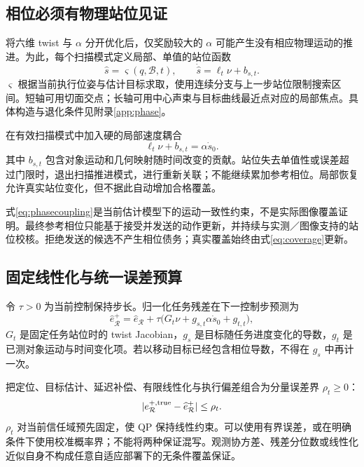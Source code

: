 \documentclass[UTF8,11pt,a4paper,fontset=fandol]{ctexart}
\numberwithin{equation}{section}
\theoremstyle{definition}
\begin{document}
\subsection{相位必须有物理站位见证}
\label{sec:phase}
将六维 twist 与 $\alpha$ 分开优化后，仅奖励较大的 $\alpha$ 可能产生没有相应物理运动的推进。为此，每个扫描模式定义局部、单值的站位函数
\begin{equation}
\widehat s=\varsigma(q,\mathcal B,t),\qquad
\dot{\widehat s}=\ell_t\nu+b_{s,t}.
\label{eq:station}
\end{equation}
$\varsigma$ 根据当前执行位姿与估计目标求取，使用连续分支与上一步站位限制搜索区间。短轴可用切面交点；长轴可用中心声束与目标曲线最近点对应的局部焦点。具体构造与退化条件见附录\ref{app:phase}。

在有效扫描模式中加入硬的局部速度耦合
\begin{equation}
\boxed{\ell_t\nu+b_{s,t}=\alpha\dot s_0.}
\label{eq:phasecoupling}
\end{equation}
其中 $b_{s,t}$ 包含对象运动和几何映射随时间改变的贡献。站位失去单值性或误差超过门限时，退出扫描推进模式，进行重新关联；不能继续累加参考相位。局部恢复允许真实站位变化，但不据此自动增加合格覆盖。

式\eqref{eq:phasecoupling}是当前估计模型下的运动一致性约束，不是实际图像覆盖证明。最终参考相位只能基于接受并发送的动作更新，并持续与实测／图像支持的站位校核。拒绝发送的候选不产生相位债务；真实覆盖始终由式\eqref{eq:coverage}更新。

\subsection{固定线性化与统一误差预算}
令 $\tau>0$ 为当前控制保持步长。归一化任务残差在下一控制步预测为
\begin{equation}
\widehat e_{\mathcal R}^+
=\widehat e_{\mathcal R}+\tau\bigl(G_t\nu+g_{s,t}\alpha\dot s_0+g_{t,t}\bigr),
\label{eq:onepred}
\end{equation}
$G_t$ 是固定任务站位时的 twist Jacobian，$g_s$ 是目标随任务进度变化的导数，$g_t$ 是已测对象运动与时间变化项。若以移动目标已经包含相位导数，不得在 $g_s$ 中再计一次。

把定位、目标估计、延迟补偿、有限线性化与执行偏差组合为分量误差界 $\rho_t\ge0$：
\begin{equation}
|e_{\mathcal R}^{+,\rm true}-\widehat e_{\mathcal R}^+|\le\rho_t.
\label{eq:errorbudget}
\end{equation}
$\rho_t$ 对当前信任域预先固定，使 QP 保持线性约束。可以使用有界误差，或在明确条件下使用校准概率界；不能将两种保证混写。观测协方差、残差分位数或线性化近似自身不构成任意自适应部署下的无条件覆盖保证。
\end{document}

